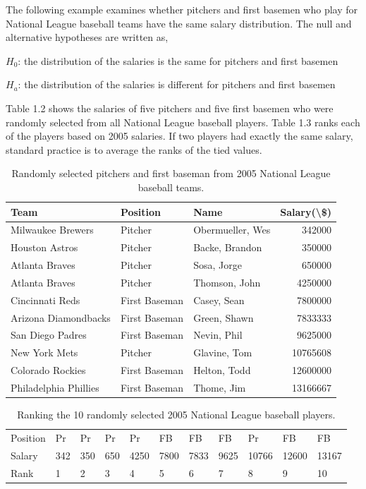 \documentclass[
]{book}
\begin{document}
The following example examines whether pitchers and first basemen who play for National League baseball teams have the same salary distribution. The null and alternative hypotheses are written as,

\begin{center}$H_0$: the distribution of the salaries is the same for pitchers and first basemen
\end{center}

\begin{center}
$H_a$: the distribution of the salaries is different for pitchers and first basemen
\end{center}

Table 1.2 shows the salaries of five pitchers and five first basemen who were randomly selected from all National League baseball players. Table 1.3 ranks each of the players based on 2005 salaries. If two players had exactly the same salary, standard practice is to average the ranks of the tied values.

\begin{table}

\caption{\label{tab:table2}Randomly selected pitchers and first baseman from 2005 National League baseball teams.}
\centering
\begin{tabular}[t]{lllr}
\toprule
Team & Position & Name & Salary(\textbackslash{}\$)\\
\midrule
Milwaukee Brewers & Pitcher & Obermueller, Wes & 342000\\
Houston Astros & Pitcher & Backe, Brandon & 350000\\
Atlanta Braves & Pitcher & Sosa, Jorge & 650000\\
Atlanta Braves & Pitcher & Thomson, John & 4250000\\
Cincinnati Reds & First Baseman & Casey, Sean & 7800000\\
\addlinespace
Arizona Diamondbacks & First Baseman & Green, Shawn & 7833333\\
San Diego Padres & First Baseman & Nevin, Phil & 9625000\\
New York Mets & Pitcher & Glavine, Tom & 10765608\\
Colorado Rockies & First Baseman & Helton, Todd & 12600000\\
Philadelphia Phillies & First Baseman & Thome, Jim & 13166667\\
\bottomrule
\end{tabular}
\end{table}

\begin{table}

\caption{\label{tab:table3}Ranking the 10 randomly selected 2005 National League baseball players.}
\centering
\begin{tabular}[t]{lllllllllll}
\toprule
Position & Pr & Pr & Pr & Pr & FB & FB & FB & Pr & FB & FB\\
Salary & 342 & 350 & 650 & 4250 & 7800 & 7833 & 9625 & 10766 & 12600 & 13167\\
Rank & 1 & 2 & 3 & 4 & 5 & 6 & 7 & 8 & 9 & 10\\
\bottomrule
\end{tabular}
\end{table}
\end{document}
